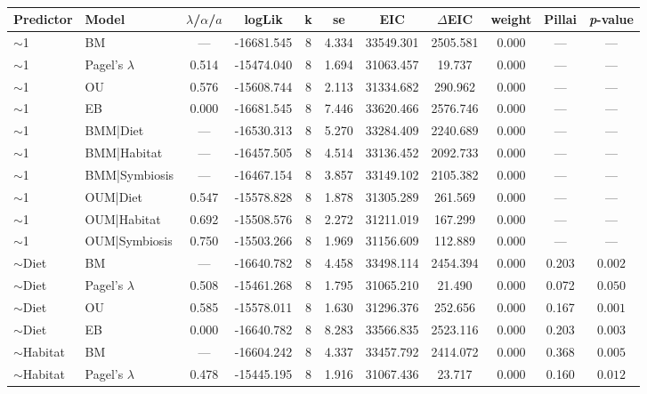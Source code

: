\begin{table}
\centering
\caption{\label{tab:mvgls_col}}
\centering
\begin{tabular}[t]{llccccccccc}
\toprule
Predictor & Model & $\lambda$/$\alpha$/$a$ & logLik & k & se & EIC & $\Delta$EIC & weight & Pillai & \textit{p}-value\\
\midrule
$\sim$1 & BM & --- & -16681.545 & 8 & 4.334 & 33549.301 & 2505.581 & 0.000 & --- & ---\\
$\sim$1 & Pagel's $\lambda$ & 0.514 & -15474.040 & 8 & 1.694 & 31063.457 & 19.737 & 0.000 & --- & ---\\
$\sim$1 & OU & 0.576 & -15608.744 & 8 & 2.113 & 31334.682 & 290.962 & 0.000 & --- & ---\\
$\sim$1 & EB & 0.000 & -16681.545 & 8 & 7.446 & 33620.466 & 2576.746 & 0.000 & --- & ---\\
$\sim$1 & BMM|Diet & --- & -16530.313 & 8 & 5.270 & 33284.409 & 2240.689 & 0.000 & --- & ---\\
\addlinespace
$\sim$1 & BMM|Habitat & --- & -16457.505 & 8 & 4.514 & 33136.452 & 2092.733 & 0.000 & --- & ---\\
$\sim$1 & BMM|Symbiosis & --- & -16467.154 & 8 & 3.857 & 33149.102 & 2105.382 & 0.000 & --- & ---\\
$\sim$1 & OUM|Diet & 0.547 & -15578.828 & 8 & 1.878 & 31305.289 & 261.569 & 0.000 & --- & ---\\
$\sim$1 & OUM|Habitat & 0.692 & -15508.576 & 8 & 2.272 & 31211.019 & 167.299 & 0.000 & --- & ---\\
$\sim$1 & OUM|Symbiosis & 0.750 & -15503.266 & 8 & 1.969 & 31156.609 & 112.889 & 0.000 & --- & ---\\
\addlinespace
$\sim$Diet & BM & --- & -16640.782 & 8 & 4.458 & 33498.114 & 2454.394 & 0.000 & 0.203 & $0.002$\\
$\sim$Diet & Pagel's $\lambda$ & 0.508 & -15461.268 & 8 & 1.795 & 31065.210 & 21.490 & 0.000 & 0.072 & $0.050$\\
$\sim$Diet & OU & 0.585 & -15578.011 & 8 & 1.630 & 31296.376 & 252.656 & 0.000 & 0.167 & $0.001$\\
$\sim$Diet & EB & 0.000 & -16640.782 & 8 & 8.283 & 33566.835 & 2523.116 & 0.000 & 0.203 & $0.003$\\
$\sim$Habitat & BM & --- & -16604.242 & 8 & 4.337 & 33457.792 & 2414.072 & 0.000 & 0.368 & $0.005$\\
\addlinespace
$\sim$Habitat & Pagel's $\lambda$ & 0.478 & -15445.195 & 8 & 1.916 & 31067.436 & 23.717 & 0.000 & 0.160 & $0.012$\\

\end{tabular}
\end{table}
